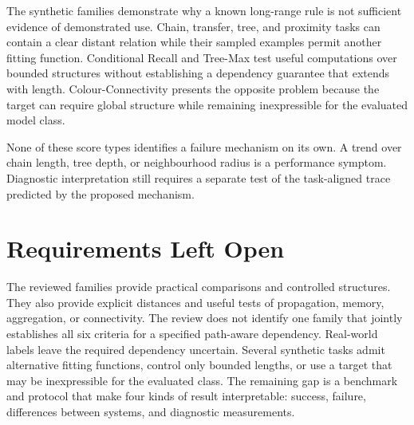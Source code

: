 The synthetic families demonstrate why a known long-range rule is not sufficient evidence of demonstrated use.
Chain, transfer, tree, and proximity tasks can contain a clear distant relation while their sampled examples permit another fitting function.
Conditional Recall and Tree-Max test useful computations over bounded structures without establishing a dependency guarantee that extends with length.
Colour-Connectivity presents the opposite problem because the target can require global structure while remaining inexpressible for the evaluated model class.

None of these score types identifies a failure mechanism on its own.
A trend over chain length, tree depth, or neighbourhood radius is a performance symptom.
Diagnostic interpretation still requires a separate test of the task-aligned trace predicted by the proposed mechanism.

\section{Requirements Left Open}
\label{sec:sota-synthesis}

The reviewed families provide practical comparisons and controlled structures.
They also provide explicit distances and useful tests of propagation, memory, aggregation, or connectivity.
The review does not identify one family that jointly establishes all six criteria for a specified path-aware dependency.
Real-world labels leave the required dependency uncertain.
Several synthetic tasks admit alternative fitting functions, control only bounded lengths, or use a target that may be inexpressible for the evaluated class.
The remaining gap is a benchmark and protocol that make four kinds of result interpretable: success, failure, differences between systems, and diagnostic measurements.

